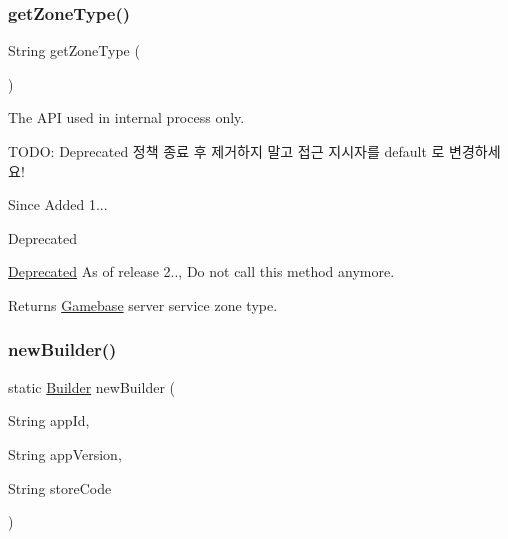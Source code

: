 \subsubsection{\texorpdfstring{get\+Zone\+Type()}{getZoneType()}}
{\footnotesize\ttfamily String get\+Zone\+Type (\begin{DoxyParamCaption}{ }\end{DoxyParamCaption})}



The A\+PI used in internal process only. 

T\+O\+DO\+: Deprecated 정책 종료 후 제거하지 말고 접근 지시자를 default 로 변경하세요!

\begin{DoxySince}{Since}
Added 1... 
\end{DoxySince}
\begin{DoxyRefDesc}{Deprecated}
\item[\hyperlink{deprecated__deprecated000006}{Deprecated}]As of release 2.., Do not call this method anymore. \end{DoxyRefDesc}
\begin{DoxyReturn}{Returns}
\hyperlink{classcom_1_1toast_1_1android_1_1gamebase_1_1_gamebase}{Gamebase} server service zone type. 
\end{DoxyReturn}
\mbox{\label{classcom_1_1toast_1_1android_1_1gamebase_1_1_gamebase_configuration_a7c28786c8e446dd54cb5f4d0797b6564}} 
\subsubsection{\texorpdfstring{new\+Builder()}{newBuilder()}}
{\footnotesize\ttfamily static \hyperlink{classcom_1_1toast_1_1android_1_1gamebase_1_1_gamebase_configuration_1_1_builder}{Builder} new\+Builder (\begin{DoxyParamCaption}\item[{String}]{app\+Id,  }\item[{String}]{app\+Version,  }\item[{String}]{store\+Code }\end{DoxyParamCaption})\hspace{0.3cm}{\ttfamily [static]}}



